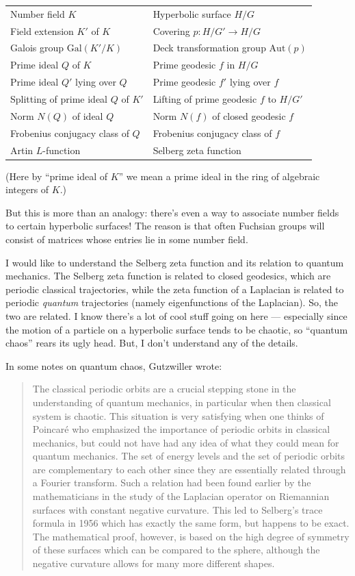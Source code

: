 \documentclass{article}
\begin{document}
\begin{longtable}[]{@{}ll@{}}
\toprule
\endhead
Number field \(K\) & Hyperbolic surface \(H/G\)\tabularnewline
Field extension \(K'\) of \(K\) & Covering
\(p\colon H/G' \to H/G\)\tabularnewline
Galois group \(\mathrm{Gal}(K'/K)\) & Deck transformation group
\(\mathrm{Aut}(p)\)\tabularnewline
Prime ideal \(Q\) of \(K\) & Prime geodesic \(f\) in
\(H/G\)\tabularnewline
Prime ideal \(Q'\) lying over \(Q\) & Prime geodesic \(f'\) lying over
\(f\)\tabularnewline
Splitting of prime ideal \(Q\) of \(K'\) & Lifting of prime geodesic
\(f\) to \(H/G'\)\tabularnewline
Norm \(N(Q)\) of ideal \(Q\) & Norm \(N(f)\) of closed geodesic
\(f\)\tabularnewline
Frobenius conjugacy class of \(Q\) & Frobenius conjugacy class of
\(f\)\tabularnewline
Artin \(L\)-function & Selberg zeta function\tabularnewline
\bottomrule
\end{longtable}

(Here by ``prime ideal of \(K\)'' we mean a prime ideal in the ring of
algebraic integers of \(K\).)

But this is more than an analogy: there's even a way to associate number
fields to certain hyperbolic surfaces! The reason is that often Fuchsian
groups will consist of matrices whose entries lie in some number field.

I would like to understand the Selberg zeta function and its relation to
quantum mechanics. The Selberg zeta function is related to closed
geodesics, which are periodic classical trajectories, while the zeta
function of a Laplacian is related to periodic \emph{quantum}
trajectories (namely eigenfunctions of the Laplacian). So, the two are
related. I know there's a lot of cool stuff going on here --- especially
since the motion of a particle on a hyperbolic surface tends to be
chaotic, so ``quantum chaos'' rears its ugly head. But, I don't
understand any of the details.

In some notes on quantum chaos, Gutzwiller wrote:

\begin{quote}
The classical periodic orbits are a crucial stepping stone in the
understanding of quantum mechanics, in particular when then classical
system is chaotic. This situation is very satisfying when one thinks of
Poincaré who emphasized the importance of periodic orbits in classical
mechanics, but could not have had any idea of what they could mean for
quantum mechanics. The set of energy levels and the set of periodic
orbits are complementary to each other since they are essentially
related through a Fourier transform. Such a relation had been found
earlier by the mathematicians in the study of the Laplacian operator on
Riemannian surfaces with constant negative curvature. This led to
Selberg's trace formula in 1956 which has exactly the same form, but
happens to be exact. The mathematical proof, however, is based on the
high degree of symmetry of these surfaces which can be compared to the
sphere, although the negative curvature allows for many more different
shapes.
\end{quote}
\end{document}
